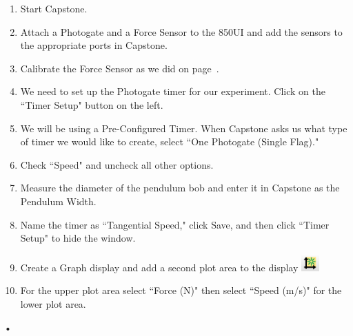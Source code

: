 \documentclass[main.tex]{subfiles}
\begin{document}
\begin{enumerate}
\item
Start Capstone.
\item
Attach a Photogate and a Force Sensor to the 850UI and add the sensors to the appropriate ports in Capstone.
\item
Calibrate the Force Sensor as we did on page~\pageref{page:Calibration}.
\item
We need to set up the Photogate timer for our experiment. Click on the ``Timer Setup" button on the left.
\item
We will be using a Pre-Configured Timer. When Capstone asks us what type of timer we would like to create, select ``One Photogate (Single Flag)."
\item
Check ``Speed" and uncheck all other options.
\item
Measure the diameter of the pendulum bob and enter it in Capstone as the Pendulum Width.
\item
Name the timer as ``Tangential Speed," click Save, and then click ``Timer Setup" to hide the window.
\item
Create a Graph display and add a second plot area to the display \includegraphics{Add_New_Plot}
\item
For the upper plot area select ``Force (N)" then select ``Speed (m/s)" for the lower plot area.
\end{enumerate}•
\end{document}
